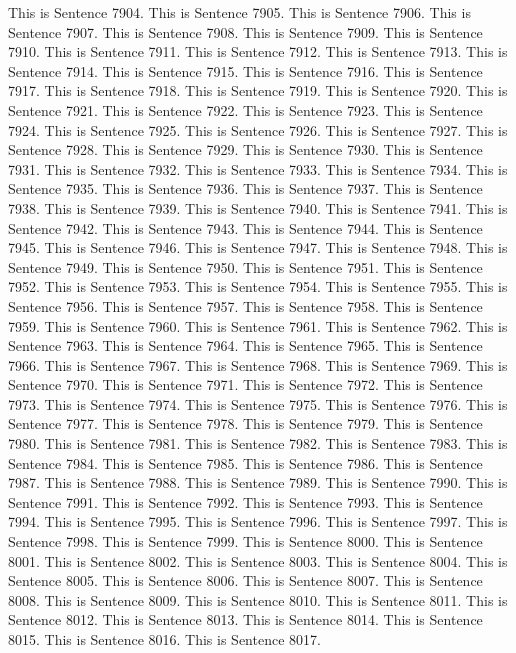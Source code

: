 \documentclass{article}
\begin{document}
This is Sentence 7904.
This is Sentence 7905.
This is Sentence 7906.
This is Sentence 7907.
This is Sentence 7908.
This is Sentence 7909.
This is Sentence 7910.
This is Sentence 7911.
This is Sentence 7912.
This is Sentence 7913.
This is Sentence 7914.
This is Sentence 7915.
This is Sentence 7916.
This is Sentence 7917.
This is Sentence 7918.
This is Sentence 7919.
This is Sentence 7920.
This is Sentence 7921.
This is Sentence 7922.
This is Sentence 7923.
This is Sentence 7924.
This is Sentence 7925.
This is Sentence 7926.
This is Sentence 7927.
This is Sentence 7928.
This is Sentence 7929.
This is Sentence 7930.
This is Sentence 7931.
This is Sentence 7932.
This is Sentence 7933.
This is Sentence 7934.
This is Sentence 7935.
This is Sentence 7936.
This is Sentence 7937.
This is Sentence 7938.
This is Sentence 7939.
This is Sentence 7940.
This is Sentence 7941.
This is Sentence 7942.
This is Sentence 7943.
This is Sentence 7944.
This is Sentence 7945.
This is Sentence 7946.
This is Sentence 7947.
This is Sentence 7948.
This is Sentence 7949.
This is Sentence 7950.
This is Sentence 7951.
This is Sentence 7952.
This is Sentence 7953.
This is Sentence 7954.
This is Sentence 7955.
This is Sentence 7956.
This is Sentence 7957.
This is Sentence 7958.
This is Sentence 7959.
This is Sentence 7960.
This is Sentence 7961.
This is Sentence 7962.
This is Sentence 7963.
This is Sentence 7964.
This is Sentence 7965.
This is Sentence 7966.
This is Sentence 7967.
This is Sentence 7968.
This is Sentence 7969.
This is Sentence 7970.
This is Sentence 7971.
This is Sentence 7972.
This is Sentence 7973.
This is Sentence 7974.
This is Sentence 7975.
This is Sentence 7976.
This is Sentence 7977.
This is Sentence 7978.
This is Sentence 7979.
This is Sentence 7980.
This is Sentence 7981.
This is Sentence 7982.
This is Sentence 7983.
This is Sentence 7984.
This is Sentence 7985.
This is Sentence 7986.
This is Sentence 7987.
This is Sentence 7988.
This is Sentence 7989.
This is Sentence 7990.
This is Sentence 7991.
This is Sentence 7992.
This is Sentence 7993.
This is Sentence 7994.
This is Sentence 7995.
This is Sentence 7996.
This is Sentence 7997.
This is Sentence 7998.
This is Sentence 7999.
This is Sentence 8000.
This is Sentence 8001.
This is Sentence 8002.
This is Sentence 8003.
This is Sentence 8004.
This is Sentence 8005.
This is Sentence 8006.
This is Sentence 8007.
This is Sentence 8008.
This is Sentence 8009.
This is Sentence 8010.
This is Sentence 8011.
This is Sentence 8012.
This is Sentence 8013.
This is Sentence 8014.
This is Sentence 8015.
This is Sentence 8016.
This is Sentence 8017.
\end{document}
